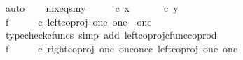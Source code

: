 \begin{isabellebody}
\ auto\isanewline
\isanewline
\ \ \isamarkupfalse%
\ mx{\isacharunderscore}{\kern0pt}eqs{\isacharunderscore}{\kern0pt}my{\isacharcolon}{\kern0pt}\ {\isachardoublequoteopen}{\isasymlangle}{\isasymt}{\isacharcomma}{\kern0pt}{\isasymt}{\isasymrangle}\ {\isasymamalg}\ {\isasymlangle}{\isasymt}{\isacharcomma}{\kern0pt}{\isasymf}{\isasymrangle}\ {\isasymamalg}\ {\isasymlangle}{\isasymf}{\isacharcomma}{\kern0pt}{\isasymt}{\isasymrangle}\ {\isasymcirc}\isactrlsub c\ x\ {\isacharequal}{\kern0pt}\ {\isasymlangle}{\isasymt}{\isacharcomma}{\kern0pt}{\isasymt}{\isasymrangle}\ {\isasymamalg}\ {\isasymlangle}{\isasymt}{\isacharcomma}{\kern0pt}{\isasymf}{\isasymrangle}\ {\isasymamalg}\ {\isasymlangle}{\isasymf}{\isacharcomma}{\kern0pt}{\isasymt}{\isasymrangle}\ {\isasymcirc}\isactrlsub c\ y{\isachardoublequoteclose}\isanewline
\isanewline
\ \ \isamarkupfalse%
\ f{}{\isacharcolon}{\kern0pt}\ {\isachardoublequoteopen}{\isasymlangle}{\isasymt}{\isacharcomma}{\kern0pt}{\isasymt}{\isasymrangle}\ {\isasymamalg}\ {\isasymlangle}{\isasymt}{\isacharcomma}{\kern0pt}{\isasymf}{\isasymrangle}\ {\isasymamalg}\ {\isasymlangle}{\isasymf}{\isacharcomma}{\kern0pt}{\isasymt}{\isasymrangle}\ {\isasymcirc}\isactrlsub c\ left{\isacharunderscore}{\kern0pt}coproj\ one\ {\isacharparenleft}{\kern0pt}one\ {\isasymCoprod}\ one{\isacharparenright}{\kern0pt}\ {\isacharequal}{\kern0pt}\ {\isasymlangle}{\isasymt}{\isacharcomma}{\kern0pt}{\isasymt}{\isasymrangle}{\isachardoublequoteclose}\isanewline
\ \ \ \ \isamarkupfalse%
\ {\isacharparenleft}{\kern0pt}typecheck{\isacharunderscore}{\kern0pt}cfuncs{\isacharcomma}{\kern0pt}\ simp\ add{\isacharcolon}{\kern0pt}\ left{\isacharunderscore}{\kern0pt}coproj{\isacharunderscore}{\kern0pt}cfunc{\isacharunderscore}{\kern0pt}coprod{\isacharparenright}{\kern0pt}\isanewline
\ \ \isamarkupfalse%
\ f{}{\isacharcolon}{\kern0pt}\ {\isachardoublequoteopen}{\isasymlangle}{\isasymt}{\isacharcomma}{\kern0pt}{\isasymt}{\isasymrangle}\ {\isasymamalg}\ {\isasymlangle}{\isasymt}{\isacharcomma}{\kern0pt}{\isasymf}{\isasymrangle}\ {\isasymamalg}\ {\isasymlangle}{\isasymf}{\isacharcomma}{\kern0pt}{\isasymt}{\isasymrangle}\ {\isasymcirc}\isactrlsub c\ {\isacharparenleft}{\kern0pt}right{\isacharunderscore}{\kern0pt}coproj\ one\ {\isacharparenleft}{\kern0pt}one{\isasymCoprod}one{\isacharparenright}{\kern0pt}{\isasymcirc}\isactrlsub c\ left{\isacharunderscore}{\kern0pt}coproj\ one\ one{\isacharparenright}{\kern0pt}\ {\isacharequal}{\kern0pt}\ {\isasymlangle}{\isasymt}{\isacharcomma}{\kern0pt}{\isasymf}{\isasymrangle}{\isachardoublequoteclose}\isanewline

\end{isabellebody}
